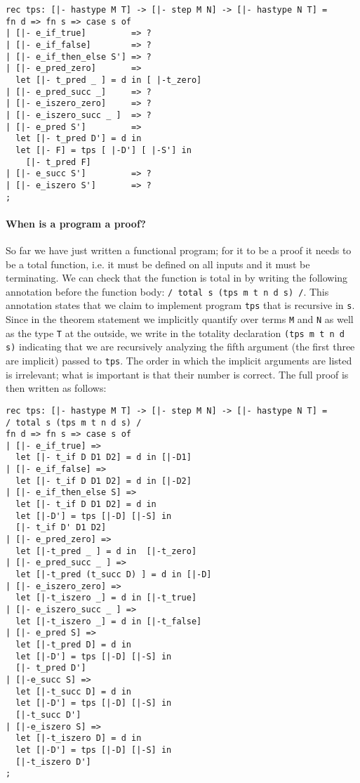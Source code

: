 \begin{lstlisting}
rec tps: [|- hastype M T] -> [|- step M N] -> [|- hastype N T] =
fn d => fn s => case s of
| [|- e_if_true]         => ?
| [|- e_if_false]        => ?
| [|- e_if_then_else S'] => ?
| [|- e_pred_zero]       =>
  let [|- t_pred _ ] = d in [ |-t_zero]
| [|- e_pred_succ _]     => ?
| [|- e_iszero_zero]     => ?
| [|- e_iszero_succ _ ]  => ?
| [|- e_pred S']         =>
  let [|- t_pred D'] = d in
  let [|- F] = tps [ |-D'] [ |-S'] in
    [|- t_pred F]
| [|- e_succ S']         => ?
| [|- e_iszero S']       => ?
;
\end{lstlisting}

\paragraph{When is a program a proof?} So far we have just written a functional
program; for it to be a proof it needs to be a total function, i.e. it must be
defined on all inputs and it must be terminating. We can check that the function
is total in \beluga by writing the following annotation before
the function body: \lstinline!/ total s (tps m t n d s) /!. This
annotation states that we claim to implement program \lstinline!tps! that is
recursive in \lstinline!s!. Since in the theorem statement we implicitly quantify over
terms \lstinline!M! and \lstinline!N! as well as the type \lstinline!T! at the
outside, we write in the totality declaration
\lstinline!(tps m t n d s)! indicating that we are recursively analyzing the fifth
argument (the first three are implicit) passed to \lstinline!tps!. The
order in which the implicit arguments are listed is irrelevant; what is
important is that their number is correct. The full proof is then written as
follows:

\begin{lstlisting}
rec tps: [|- hastype M T] -> [|- step M N] -> [|- hastype N T] =
/ total s (tps m t n d s) /
fn d => fn s => case s of
| [|- e_if_true] =>
  let [|- t_if D D1 D2] = d in [|-D1]
| [|- e_if_false] =>
  let [|- t_if D D1 D2] = d in [|-D2]
| [|- e_if_then_else S] =>
  let [|- t_if D D1 D2] = d in
  let [|-D'] = tps [|-D] [|-S] in
  [|- t_if D' D1 D2]
| [|- e_pred_zero] =>
  let [|-t_pred _ ] = d in  [|-t_zero]
| [|- e_pred_succ _ ] =>
  let [|-t_pred (t_succ D) ] = d in [|-D]
| [|- e_iszero_zero] =>
  let [|-t_iszero _] = d in [|-t_true]
| [|- e_iszero_succ _ ] =>
  let [|-t_iszero _] = d in [|-t_false]
| [|- e_pred S] =>
  let [|-t_pred D] = d in
  let [|-D'] = tps [|-D] [|-S] in
  [|- t_pred D']
| [|-e_succ S] =>
  let [|-t_succ D] = d in
  let [|-D'] = tps [|-D] [|-S] in
  [|-t_succ D']
| [|-e_iszero S] =>
  let [|-t_iszero D] = d in
  let [|-D'] = tps [|-D] [|-S] in
  [|-t_iszero D']
;
\end{lstlisting}

